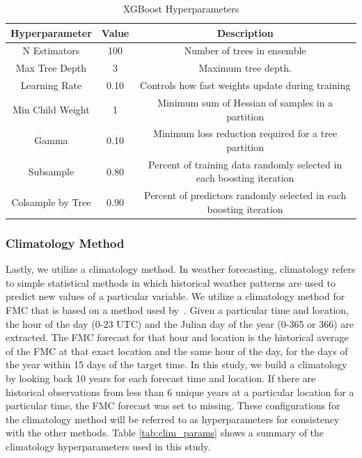 \documentclass[fire,article,submit,pdftex,moreauthors]{Definitions/mdpi}
\begin{document}
\begin{table}[tbh]
\caption{XGBoost Hyperparameters}
\label{tab:xgb_params}
\small
\begin{tabularx}{\textwidth}{CCC}
\toprule
\textbf{Hyperparameter} & \textbf{Value} & \textbf{Description} \\
\midrule
N Estimators & 100 & Number of trees in ensemble \\
\midrule
Max Tree Depth & 3 & Maximum tree depth. \\
\midrule
Learning Rate & 0.10 & Controls how fast weights update during training \\
\midrule
Min Child Weight & 1 & Minimum sum of Hessian of samples in a partition \\
\midrule
Gamma & 0.10 & Minimum loss reduction required for a tree partition \\
\midrule
Subsample & 0.80 & Percent of training data randomly selected in each boosting iteration \\
\midrule
Colsample by Tree & 0.90 & Percent of predictors randomly selected in each boosting iteration \\
\bottomrule
\end{tabularx}
\end{table}

\subsubsection{Climatology Method}
Lastly, we utilize a climatology method. In weather forecasting, climatology refers to simple statistical methods in which historical weather patterns are used to predict new values of a particular variable. We utilize a climatology method for FMC that is based on a method used by~\citet{Schreck-2023-MLV}. Given a particular time and location, the hour of the day (0-23 UTC) and the Julian day of the year (0-365 or 366) are extracted. The FMC forecast for that hour and location is the historical average of the FMC at that exact location and the same hour of the day, for the days of the year within 15 days of the target time. In this study, we build a climatology by looking back 10 years for each forecast time and location. If there are historical observations from less than 6 unique years at a particular location for a particular time, the FMC forecast was set to missing. These configurations for the climatology method will be referred to as hyperparameters for consistency with the other methods. Table \ref{tab:clim_params} shows a summary of the climatology hyperparameters used in this study.
\end{document}
